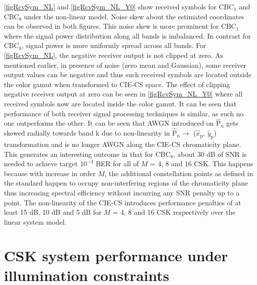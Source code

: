 \figurename{ }\ref{figRcvSym_NL} and \figurename{ }\ref{figRcvSym_NL_Y0} show received symbols for CBC$_{1}$ and CBC$_{8}$ under the non-linear model. Noise skew about the estimated coordinates can be observed in both figures. This noise skew is more prominent for CBC$_{1}$ where the signal power distribution along all bands is imbalanced. In contrast for CBC$_{8}$, signal power is more uniformly spread across all bands. For \figurename{ }\ref{figRcvSym_NL}, the negative receiver output is not clipped at zero. As mentioned earlier, in presence of noise (zero mean and Gaussian), some receiver output values can be negative and thus such received symbols are located outside the color gamut when transformed to CIE-CS space. The effect of clipping negative receiver output at zero can be seen in \figurename{ }\ref{figRcvSym_NL_Y0} where all received symbols now are located inside the color gamut. It can be seen that performance of both receiver signal processing techniques is similar, as such no one outperforms the other. It can be seen that AWGN introduced on $\hat{\text{P}}_{n}$ gets skewed radially towards band k due to non-linearity in $\hat{\text{P}}_{n}\rightarrow$ ($\hat{x}_{\text{p}}$, $\hat{y}_{\text{p}}$) transformation and is no longer AWGN along the CIE-CS chromaticity plane. This generates an interesting outcome in that for CBC$_{8}$, about 30 dB of SNR is needed to achieve target $10^{-3}$ BER for all of $M$ = 4, 8 and 16 CSK. This happens because with increase in order $M$, the additional constellation points as defined in the standard happen to occupy non-interfering regions of the chromaticity plane thus increasing spectral efficiency without incurring any SNR penalty up to a point. The non-linearity of the CIE-CS introduces performance penalties of at least 15 dB, 10 dB and 5 dB for $M$ = 4, 8 and 16 CSK respectively over the linear system model. 

\section{CSK system performance under illumination constraints}
\label{sec:cskIllumination}

